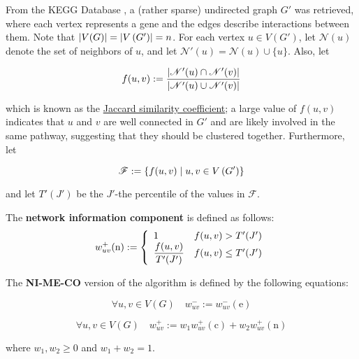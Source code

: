 From the KEGG Database \cite{kegg}, a (rather sparse) undirected graph $G'$ was retrieved, where each vertex represents a gene and the edges describe interactions between them. Note that $\abs{V(G)} = \abs{V \left(G' \right)} = n$. For each vertex $u \in V \left(G' \right)$, let $\mathscr{N}(u)$ denote the set of neighbors of $u$, and let $\mathscr{N}'(u) = \mathscr{N}(u) \cup \{u\}$. Also, let

\begin{equation}
    f(u, v) := \dfrac{\abs{\mathscr{N}'(u) \cap \mathscr{N}'(v)}}{\abs{\mathscr{N}'(u) \cup \mathscr{N}'(v)}}
\end{equation}

which is known as the \href{https://en.wikipedia.org/wiki/Jaccard_index}{Jaccard similarity coefficient}; a large value of $f(u, v)$ indicates that $u$ and $v$ are well connected in $G'$ and are likely involved in the same pathway, suggesting that they should be clustered together. Furthermore, let

\begin{equation}
    \mathscr{F} := \{f(u, v) \mid u, v \in V\rbk{G'}\}
\end{equation}

and let $T'(J')$ be the $J'$-the percentile of the values in $\mathscr F$.

\begin{definition}
    The \textbf{network information component} is defined as follows: $$w_{uv}^+(\mathrm n) := \soe{ll}{1 & f(u, v) > T'(J') \\ \dfrac{f(u, v)}{T'(J')} & f(u, v) \le T'(J')}$$
\end{definition}

\begin{definition}[NI-ME-CO]
    The \textbf{NI-ME-CO} version of the algorithm is defined by the following equations:

    \begin{equation}
        \forall u, v \in V(G) \quad w_{uv}^- := w_{uv}^-(\mathrm e)
    \end{equation}

    \begin{equation}
        \forall u, v \in V(G) \quad w_{uv}^+ := w_1 w_{uv}^+(\mathrm c) + w_2 w_{uv}^+(\mathrm n)
    \end{equation}

    where $w_1, w_2 \ge 0$ and $w_1 + w_2 = 1$.
\end{definition}

